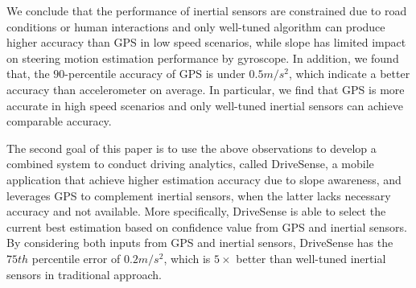 We conclude that the performance of inertial sensors are constrained due to
road conditions or human interactions and only well-tuned algorithm can produce higher accuracy 
than GPS in low speed scenarios, 
while slope has limited impact on steering motion estimation performance by gyroscope. 
In addition, we found that, the $90$-percentile accuracy of GPS is under $0.5m/s^2$, 
which indicate a better accuracy than accelerometer on average. 
In particular, we find that GPS is more accurate in high speed scenarios and 
only well-tuned inertial sensors can achieve comparable accuracy. 


The second goal of this paper is to use the above observations to develop a combined system
to conduct driving analytics, called DriveSense, a mobile application that achieve
higher estimation accuracy due to slope awareness, and leverages GPS to complement
inertial sensors, when the latter lacks necessary accuracy and not available. 
More specifically,
DriveSense is able to select the current best estimation 
based on confidence value from GPS and inertial sensors. 
By considering both inputs from GPS and inertial sensors, 
DriveSense has the $75th$ percentile error of $0.2m/s^2$, 
which is $5\times$ better than well-tuned inertial sensors in traditional approach. 


